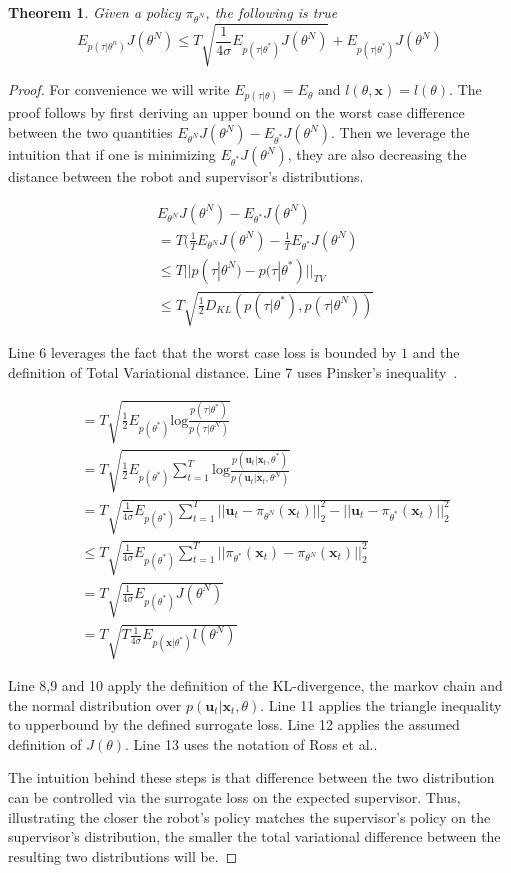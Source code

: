 \documentclass[10pt, conference]{ieeeconf}      %
\newtheorem{theorem}{Theorem}[section]
\newcommand{\bu}{\mathbf{u}}
\newcommand{\bx}{\mathbf{x}}
\begin{document}
\begin{theorem}
Given a policy $\pi_{\theta^N}$, the following is true 
$$E_{p(\tau|\theta^n)} J(\theta^N) \leq T\sqrt{\frac{1}{4\sigma}E_{p(\tau|\theta^*)} J(\theta^N)}+E_{p(\tau|\theta^*)} J(\theta^N)$$
\end{theorem}
\begin{proof}
For convenience we will write $E_{p(\tau|\theta)} = E_{\theta}$ and $l(\theta,\bx) = l(\theta)$. The proof follows by first deriving an upper bound on the worst case difference between the two quantities $E_{\theta^N} J(\theta^N) - E_{\theta^*} J(\theta^N) $. Then we leverage the intuition that if one is minimizing $E_{\theta^*} J(\theta^N) $, they are also decreasing the distance between the robot and supervisor's distributions. 

\begin{align}
&E_{\theta^N} J(\theta^N) - E_{\theta^*} J(\theta^N) \\
&= T(\frac{1}{T}E_{\theta^N} J(\theta^N) -\frac{1}{T}E_{\theta^*} J(\theta^N)\\
&\leq  T| | p(\tau|\theta^N) - p(\tau|\theta^*)||_{TV}\\
&\leq T\sqrt{\frac{1}{2} D_{KL}(p(\tau|\theta^*),p(\tau|\theta^N))}
\end{align}

 Line 6 leverages the fact that the worst case loss is bounded by $1$ and the definition of Total Variational distance. Line 7 uses Pinsker's inequality~\cite{verdu2014total}.


\begin{align}
&= T\sqrt{\frac{1}{2} E_{p(\theta^*)} \mbox{log} \frac{p(\tau|\theta^*)}{p(\tau|\theta^N)}}\\
&= T\sqrt{\frac{1}{2} E_{p(\theta^*)} \sum^T_{t=1}\mbox{log} \frac{p(\bu_t|\bx_t,\theta^*)}{p(\bu_t|\bx_t,\theta^N)}}\\
&= T\sqrt{\frac{1}{4\sigma} E_{p(\theta^*)} \sum^T_{t=1} ||\bu_t- \pi_{\theta^N}(\bx_t)||_2^2 - ||\bu_t- \pi_{\theta^*}(\bx_t)||_2^2}\\
&\leq T\sqrt{\frac{1}{4\sigma} E_{p(\theta^*)} \sum^T_{t=1}  ||\pi_{\theta^*}(\bx_t) - \pi_{\theta^N}(\bx_t)||_2^2}\\
&= T\sqrt{\frac{1}{4\sigma} E_{p(\theta^*)} J(\theta^N)}\\
&= T\sqrt{T \frac{1}{4\sigma} E_{p(\bx|\theta^*)} l(\theta^N)}
\end{align}

Line 8,9 and 10 apply the definition of the KL-divergence, the markov chain and the normal distribution over $p(\bu_t|\bx_t,\theta)$. Line 11 applies the triangle inequality to upperbound by the defined surrogate loss. Line 12 applies the assumed definition of $J(\theta)$. Line 13 uses the notation of Ross et al.. 

The intuition behind these steps is that difference between  the two distribution can be controlled via the surrogate loss on the expected supervisor. Thus, illustrating the closer the robot's policy matches the supervisor's policy on the supervisor's distribution, the smaller the total variational difference between the resulting two distributions will be. 
\end{proof}
  
\end{document}
